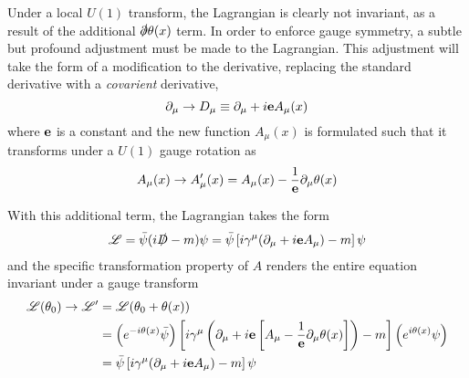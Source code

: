     Under a local $U(1)$ transform, the Lagrangian is clearly not invariant,
        as a result of the additional $\slashed{\partial}\theta(x)$ term.
    In order to enforce gauge symmetry, a subtle but profound adjustment must be made to the Lagrangian.
    This adjustment will take the form of a modification to the derivative,
        replacing the standard derivative with a \textit{covarient} derivative,
    \begin{equation}
        \partial_\mu \to D_\mu \equiv \partial_\mu + i \mathbf{e} A_\mu(x)
    \end{equation}
    where $\mathbf{e}$ is a constant and the new function $A_\mu(x)$ is formulated such that it transforms under a $U(1)$ gauge rotation as
    \begin{equation}
        A_\mu(x) \to A'_\mu(x) = A_\mu(x) - \frac{1}{\mathbf{e}} \partial_\mu \theta(x)
    \end{equation}

    With this additional term, the Lagrangian takes the form
    \begin{equation} \begin{split}
    \mathscr{L} = \bar{\psi} (i\slashed{D} - m) \psi
        = \bar{\psi} \left[i\gamma^\mu(\partial_\mu + i \mathbf{e} A_\mu) - m\right] \psi
    \end{split} \end{equation}
    and the specific transformation property of $A$ renders the entire equation invariant under a gauge transform
    \begin{equation} \begin{split}
    \mathscr{L}(\theta_0) \to \mathscr{L}' &= \mathscr{L}(\theta_0+\theta(x))
        \\&= \left( e^{-i\theta(x)} \bar{\psi} \right) 
        \left[i\gamma^\mu \left(\partial_\mu 
            + i \mathbf{e} \left[A_\mu - \frac{1}{\mathbf{e}} \partial_\mu \theta(x)\right] \right) 
            - m\right]
        \left( e^{i\theta(x)}\psi \right)
        \\&= \bar{\psi} \left[i\gamma^\mu(\partial_\mu + i \mathbf{e} A_\mu) - m\right] \psi
    \end{split} \end{equation}

